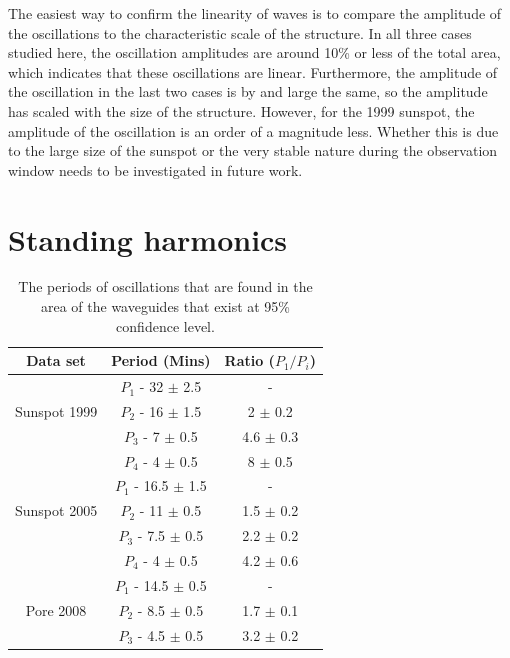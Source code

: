 	The easiest way to confirm the linearity of waves is to compare the amplitude of the oscillations to the characteristic scale of the structure.
	In all three cases studied here, the oscillation amplitudes are around 10\% or less of the total area, which indicates that these oscillations are linear.
	Furthermore, the amplitude of the oscillation in the last two cases is by and large the same, so the amplitude has scaled with the size of the structure.
	However, for the 1999 sunspot, the amplitude of the oscillation is an order of a magnitude less. Whether this is due to the large size of the sunspot or the very stable nature during the observation window needs to be investigated in future work.
	
\section{Standing harmonics}

	\begin{table}
	\centering
	\begin{tabular}{ccc}
		\hline
		Data set & Period (Mins) & Ratio ($P_{1}/P_{i}$) \\ \hline \hline
		\multirow{3}{*}{Sunspot 1999} & $P_{1}$ - 32 $\pm$ 2.5 & - \\
							  		  & $P_{2}$ - 16 $\pm$ 1.5 & 2 $\pm$ 0.2 \\
							  		  & $P_{3}$ - 7 $\pm$ 0.5 & 4.6 $\pm$ 0.3 \\
							  		  & $P_{4}$ - 4 $\pm$ 0.5 & 8 $\pm$ 0.5 \\ \hline
		\multirow{3}{*}{Sunspot 2005} & $P_{1}$ - 16.5 $\pm$ 1.5  & - \\
					      			  & $P_{2}$ - 11 $\pm$ 0.5 & 1.5 $\pm$ 0.2 \\
					      			  & $P_{3}$ - 7.5 $\pm$ 0.5 & 2.2 $\pm$ 0.2 \\
					      			  & $P_{4}$ - 4 $\pm$ 0.5 & 4.2 $\pm$ 0.6 \\ \hline
		\multirow{3}{*}{Pore 2008}    & $P_{1}$ - 14.5 $\pm$ 0.5 & - \\
		 							  & $P_{2}$ - 8.5 $\pm$ 0.5 & 1.7 $\pm$ 0.1 \\
					      			  & $P_{3}$ - 4.5 $\pm$ 0.5 & 3.2 $\pm$ 0.2 \\ \hline
	\end{tabular}
		\caption{The periods of oscillations that are found in the area of the waveguides that exist at 95\% confidence level.}
		\label{chap3:harm_table}
	\end{table}
		
